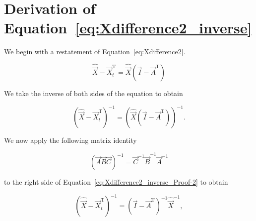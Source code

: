 %
%
%

\chapter{Derivation of Equation~\ref{eq:Xdifference2_inverse}}
\label{app:C} 



We begin with a restatement of Equation~\ref{eq:Xdifference2}.

\begin{equation} \label{eq:Xdifference2_inverse_Proof-1}
	\hat{\vec{X}} - \vec{X}_t^\mathrm{T} = \hat{\vec{X}}(\vec{I} - \vec{A}^\mathrm{T})
\end{equation}

\noindent We take the inverse of both sides of the equation to obtain

\begin{equation} \label{eq:Xdifference2_inverse_Proof-2}
	{\left(\hat{\vec{X}} - \vec{X}_t^\mathrm{T}\right)}^{-1} 
	= {\left(\hat{\vec{X}}(\vec{I} - \vec{A}^\mathrm{T})\right)}^{-1}.
\end{equation}

\noindent We now apply the following matrix identity~\cite[Formula 6.2, p. 308]{Beyer:1991vd}

\begin{equation} \label{eq:Xdifference2_inverse_Proof-3}
	{\left(\vec{A}\vec{B}\vec{C}\right)}^{-1} 
	= {\vec{C}^{-1} \vec{B}}^{-1} \vec{A}^{-1}
\end{equation}

\noindent to the right side of Equation~\ref{eq:Xdifference2_inverse_Proof-2} to obtain

\begin{equation} \label{eq:Xdifference2_inverse_Proof-4}
	{\left(\hat{\vec{X}} - \vec{X}_t^\mathrm{T}\right)}^{-1} 
	= {(\vec{I} - \vec{A}^{\mathrm{T}})}^{-1} \hat{\vec{X}}^{-1},
\end{equation}

